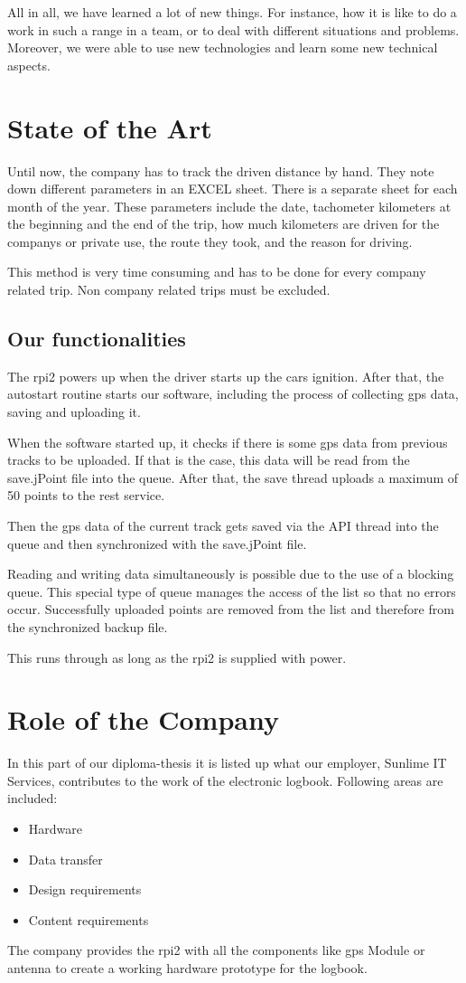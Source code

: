 All in all, we have learned a lot of new things. For instance, how it is like to do a work in such a range in a team, or to deal with different situations and problems. Moreover, we were able to use new technologies and learn some new technical aspects.
\newpage
\section*{State of the Art}
Until now, the company has to track the driven distance by hand. They note down different parameters in an EXCEL sheet. There is a separate sheet for each month of the year. These parameters include the date, tachometer kilometers at the beginning and the end of the trip, how much kilometers are driven for the companys or private use, the route they took, and the reason for driving.

This method is very time consuming and has to be done for every company related trip. Non company related trips must be excluded.
\subsection*{Our functionalities}
The \gls{rpi2} powers up when the driver starts up the cars ignition. After that, the autostart routine starts our software, including the process of collecting \gls{gps} data, saving and uploading it.

When the software started up, it checks if there is some \gls{gps} data from previous tracks to be uploaded. If that is the case, this data will be read from the save.jPoint file into the queue. After that, the save thread uploads a maximum of 50 points to the \gls{rest} service. 


Then the \gls{gps} data of the current track gets saved via the API thread into the queue and then synchronized with the save.jPoint file.

Reading and writing data simultaneously is possible due to the use of a blocking queue. This special type of queue manages the access of the list so that no errors occur.\newline
Successfully uploaded points are removed from the list and therefore from the synchronized backup file.

This runs through as long as the \gls{rpi2} is supplied with power.


\newpage
\section*{Role of the Company}
In this part of our diploma-thesis it is listed up what our employer, Sunlime IT Services, contributes to the work of the electronic logbook. Following areas are included:
\begin{itemize}
\item Hardware
\item Data transfer
\item Design requirements
\item Content requirements
\end{itemize}
The company provides the \gls{rpi2} with all the components like \gls{gps} Module or antenna to create a working hardware prototype for the logbook.

